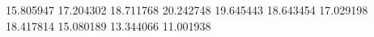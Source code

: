 15.805947
17.204302
18.711768
20.242748
19.645443
18.643454
17.029198
18.417814
15.080189
13.344066
11.001938
